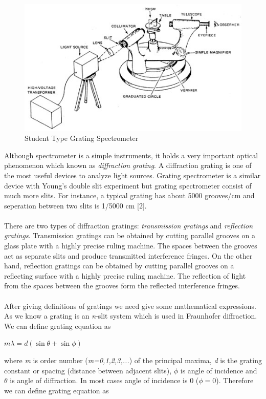 \documentclass[a4paper,12pt]{report}
\begin{document}
\begin{figure}[h]
\centering
\includegraphics[width=0.9\linewidth, height=0.40\textheight]{spectrometer}
\caption{Student Type Grating Spectrometer}
\label{fig:spectrometer}
\end{figure}Although spectrometer is a simple instruments, it holds a very important optical phenomenon which known as \textit{diffraction grating}. A diffraction grating is one of the most useful devices to analyze light sources. Grating spectrometer is a similar device with Young's double slit experiment but grating spectrometer consist of much more slits. For instance, a typical grating has about 5000 grooves/cm and seperation between two slits is 1/5000 cm [2].\\\\
There are two types of diffraction gratings: \textit{transmission gratings} and \textit{reflection gratings}. Transmission gratings can be obtained by cutting parallel grooves on a glass
plate with a highly precise ruling machine. The spaces between the grooves act as
separate slits and produce transmitted interference fringes. On the other hand, reflection gratings can be obtained by cutting parallel grooves on a reflecting
surface with a highly precise ruling machine. The reflection of light from the
spaces between the grooves form the reflected interference fringes.\\\\
After giving definitions of gratings we need give some mathematical expressions. As we know a grating is an \textit{n}-slit system which is used in Fraunhofer diffraction. We can define grating equation as 
\begin{center}
	$m\lambda=d(\sin\theta+\sin\phi)$  
\end{center}
where \textit{m} is order number (\textit{m=0,1,2,3,...}) of the principal maxima, \textit{d} is the grating constant or spacing (distance between adjacent slits), $\phi$ is angle of incidence and $\theta$ is angle of diffraction. In most cases angle of incidence is 0 ($\phi=0$). Therefore we can define grating equation as 
\end{document}

